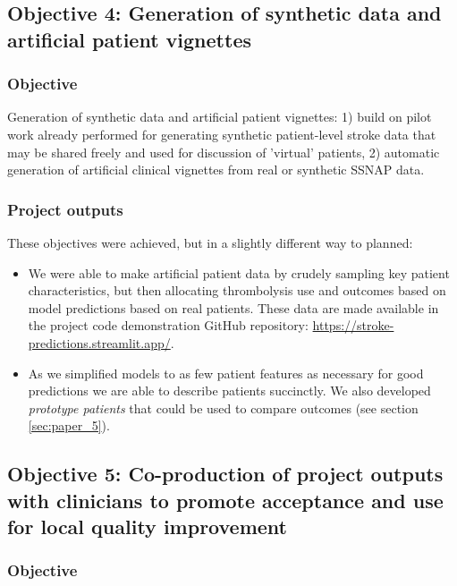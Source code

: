 \subsection{Objective 4: Generation of synthetic data and artificial patient vignettes}

\subsubsection{Objective}

Generation of synthetic data and artificial patient vignettes: 1) build on pilot work already performed for generating synthetic patient-level stroke data that may be shared freely and used for discussion of ’virtual’ patients, 2) automatic generation of artificial clinical vignettes from real or synthetic SSNAP data.

\subsubsection{Project outputs}

These objectives were achieved, but in a slightly different way to planned:

\begin{itemize}
    \item We were able to make artificial patient data by crudely sampling key patient characteristics, but then allocating thrombolysis use and outcomes based on model predictions based on real patients. These data are made available in the project code demonstration GitHub repository: \url{https://stroke-predictions.streamlit.app/}.
    \item As we simplified models to as few patient features as necessary for good predictions we are able to describe patients succinctly. We also developed \textit{prototype patients} that could be used to compare outcomes (see section \ref{sec:paper_5}).    
\end{itemize}



\subsection{Objective 5: Co-production of project outputs with clinicians to promote acceptance and use for local quality improvement}

\subsubsection{Objective}

